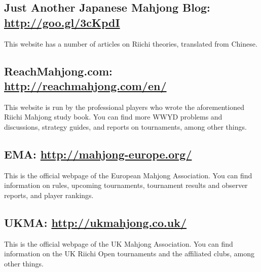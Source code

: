 \subsection*{Just Another Japanese Mahjong Blog: \\\url{http://goo.gl/3cKpdI}}
This website has a number of articles on Riichi theories, translated from Chinese. 

\subsection*{ReachMahjong.com: \url{http://reachmahjong.com/en/}}
This website is run by the professional players who wrote the aforementioned Riichi Mahjong study book. You can find more WWYD problems and discussions, strategy guides, and reports on tournaments, among other things. 

\subsection*{EMA: \url{http://mahjong-europe.org/}} 
This is the official webpage of the European Mahjong Association. You can find information on rules, upcoming tournaments, tournament results and observer reports, and player rankings. 

\subsection*{UKMA: \url{http://ukmahjong.co.uk/}} 
This is the official webpage of the UK Mahjong Association. You can find information on the UK Riichi Open tournaments and the affiliated clubs, among other things. 

